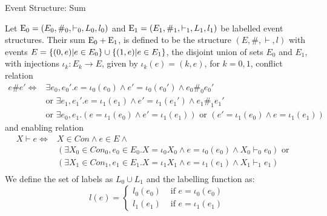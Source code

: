 \begin{frame}{Event Structure: Sum}
    \begin{definition}
        Let $\mathrm{E_0} = (E_0,\#_0,\vdash_0,L_0,l_0)$ and
        $\mathrm{E_1} = (E_1,\#_1,\vdash_1,L_1,l_1)$ be labelled event structures.
        Their sum $\mathrm{E_0} + \mathrm{E_1}$, is defined to be the structure $(E,\#,\vdash,l)$
        with events $E = \{(0,e)|e \in E_0\} \cup \{(1,e)|e \in E_1\}$,
        the disjoint union of sets $E_0$ and $E_1$,
        with injections $\iota_k: E_k \rightarrow E$, given by
        $\iota_k(e) = (k,e)$, for $k=0,1$, conflict relation
        \begin{align*}
            e \# e' \iff & \exists e_0,e_0'. e = \iota_0(e_0)
            \wedge e' = \iota_0(e_0') \wedge e_0 \#_0e_0'                       \\
                         & \text{or } \exists e_1,e_1'. e = \iota_1(e_1) \wedge
            e' = \iota_1(e_1') \wedge e_1 \#_1 e_1'                             \\
                         & \text{or } \exists e_0,e_1.(e=\iota_1(e_0)
            \wedge e' =\iota_1(e_1)) \text{ or }
            (e'=\iota_1(e_0) \wedge e =\iota_1(e_1))
        \end{align*}
        and enabling relation
        \begin{align*}
            X \vdash e \iff & X \in Con \wedge e \in E \wedge                   & \\
                            & (\exists X_0 \in Con_0,e_0 \in E_0.X = \iota_0X_0
            \wedge e = \iota_0(e_0) \wedge X_0 \vdash_0 e_0) \text{ or }          \\
                            & (\exists X_1 \in Con_1,e_1 \in E_1.X = \iota_1X_1
            \wedge e = \iota_1(e_1) \wedge X_1 \vdash_1 e_1)                      \\
        \end{align*}
        We define the set of labels as $L_0 \cup L_1$ and the labelling function as:
        $$
            l(e) = \begin{cases}
                l_0(e_0) & \text{ if } e = \iota_0(e_0) \\
                l_1(e_1) & \text{ if } e = \iota_1(e_1)
            \end{cases}
        $$
    \end{definition}
\end{frame}


